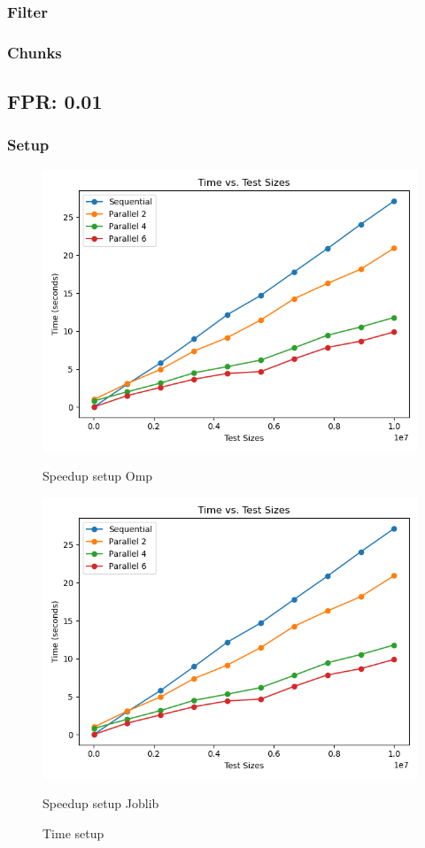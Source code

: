 \documentclass[11pt]{article}
\begin{document}
    \subsubsection{Filter}\label{subsubsec:fpr-005-filter}
    \subsubsection{Chunks}\label{subsubsec:fpr-005-chunks}

    \subsection{FPR: 0.01}\label{subsec:fpr-001}
    \subsubsection{Setup}\label{subsubsec:setup}
    \begin{figure}[H]
        \centering
        \includegraphics[width=\linewidth]{plot_setup_time}
            \caption{Speedup setup Omp}\label{fig:setup_time_omp}
        \endminipage\hfill
        \includegraphics[width=\linewidth]{plot_setup_time}
            \caption{Speedup setup Joblib}\label{fig:setup_time_joblib}
        \endminipage\hfill
        \caption{Time setup}
    \end{figure}
\end{document}
